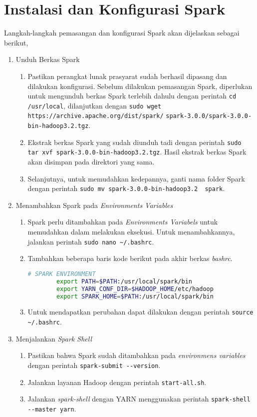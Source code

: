 \chapter{Instalasi dan Konfigurasi Spark}
\label{appendix:D}

Langkah-langkah pemasangan dan konfigurasi Spark akan dijelaskan sebagai berikut,

\begin{enumerate}
  \item Unduh Berkas Spark
  \begin{enumerate}
    \item Pastikan perangkat lunak prasyarat sudah berhasil dipasang dan dilakukan konfigurasi. Sebelum dilakukan pemasangan Spark, diperlukan untuk mengunduh berkas Spark terlebih dahulu dengan perintah \verb|cd /usr/local|, dilanjutkan dengan \verb|sudo wget https://archive.apache.org/dist/spark/|
    \newline \verb|spark-3.0.0/spark-3.0.0-bin-hadoop3.2.tgz|.    
    \item Ekstrak berkas Spark yang sudah diunduh tadi dengan perintah \verb|sudo tar xvf spark-3.0.0-bin-hadoop3.2.tgz|. Hasil ekstrak berkas Spark akan disimpan pada direktori yang sama.
    \item Selanjutnya, untuk memudahkan kedepannya, ganti nama folder Spark dengan perintah \verb|sudo mv spark-3.0.0-bin-hadoop3.2  spark|. 
  \end{enumerate}
  \item Menambahkan Spark pada \textit{Environments Variables}
  \begin{enumerate}
    \item Spark perlu ditambahkan pada \textit{Environments Variabels} untuk memudahkan dalam melakukan eksekusi. Untuk menambahkannya, jalankan perintah \verb|sudo nano ~/.bashrc|.
    \item Tambahkan beberapa baris kode berikut pada akhir berkas \textit{bashrc}.
      \begin{lstlisting}[language=bash]
		# SPARK ENVIRONMENT
		export PATH=$PATH:/usr/local/spark/bin
		export YARN_CONF_DIR=$HADOOP_HOME/etc/hadoop
		export SPARK_HOME=$PATH:/usr/local/spark/bin
      \end{lstlisting}
    \item Untuk mendapatkan perubahan dapat dilakukan dengan perintah \verb|source ~/.bashrc|.
  \end{enumerate}
  \item Menjalankan \textit{Spark Shell}
  \begin{enumerate}
    \item Pastikan bahwa Spark sudah ditambahkan pada \textit{environmens variables} dengan perintah \verb|spark-submit --version|.
    \item Jalankan layanan Hadoop dengan perintah \verb|start-all.sh|.
    \item Jalankan \textit{spark-shell} dengan YARN menggunakan perintah \verb|spark-shell --master yarn|.
  \end{enumerate}
\end{enumerate}